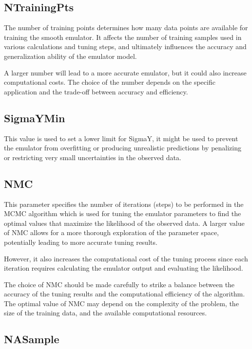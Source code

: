 \documentclass[12pt]{article}
\numberwithin{equation}{section}
\numberwithin{figure}{section}
\begin{document}
\subsection{NTrainingPts}
 The number of training points determines how many data points are available for training the smooth emulator. It affects the number of training samples used in various calculations and tuning steps, and ultimately influences the accuracy and generalization ability of the emulator model. 

A larger number will lead to a more accurate emulator, but it could also increase computational costs. The choice of the number depends on the specific application and the trade-off between accuracy and efficiency.


\subsection{SigmaYMin}
 
This value is used to set a lower limit for SigmaY, it might be used to prevent the emulator from overfitting or producing unrealistic predictions by penalizing or restricting very small uncertainties in the observed data. 



\subsection{NMC}

This parameter specifies the number of iterations (steps) to be performed in the MCMC algorithm which is used for tuning the emulator parameters to find the optimal values that maximize the likelihood of the observed data. A larger value of NMC allows for a more thorough exploration of the parameter space, potentially leading to more accurate tuning results.

However, it also increases the computational cost of the tuning process since each iteration requires calculating the emulator output and evaluating the likelihood.

The choice of NMC should be made carefully to strike a balance between the accuracy of the tuning results and the computational efficiency of the algorithm. The optimal value of NMC may depend on the complexity of the problem, the size of the training data, and the available computational resources.  




\subsection{NASample}
\end{document}
